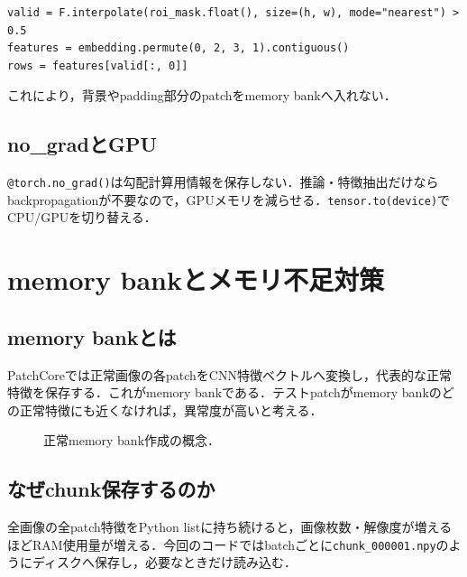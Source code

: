 \documentclass[a4paper,11pt]{ltjsreport}
\begin{document}
\begin{lstlisting}
valid = F.interpolate(roi_mask.float(), size=(h, w), mode="nearest") > 0.5
features = embedding.permute(0, 2, 3, 1).contiguous()
rows = features[valid[:, 0]]
\end{lstlisting}

これにより，背景やpadding部分のpatchをmemory bankへ入れない．

\section{no\_gradとGPU}
\texttt{@torch.no\_grad()}は勾配計算用情報を保存しない．推論・特徴抽出だけならbackpropagationが不要なので，GPUメモリを減らせる．\texttt{tensor.to(device)}でCPU/GPUを切り替える．

\chapter{memory bankとメモリ不足対策}

\section{memory bankとは}
PatchCoreでは正常画像の各patchをCNN特徴ベクトルへ変換し，代表的な正常特徴を保存する．これがmemory bankである．テストpatchがmemory bankのどの正常特徴にも近くなければ，異常度が高いと考える．

\begin{figure}[H]
\centering
{}
\caption{正常memory bank作成の概念．}
\end{figure}

\section{なぜchunk保存するのか}
全画像の全patch特徴をPython listに持ち続けると，画像枚数・解像度が増えるほどRAM使用量が増える．今回のコードではbatchごとに\texttt{chunk\_000001.npy}のようにディスクへ保存し，必要なときだけ読み込む．
\end{document}
